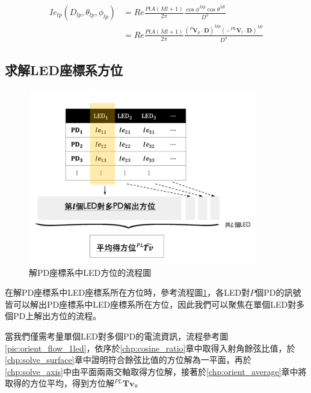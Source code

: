     \begin{equation}
        \label{eqn:model_algorithm_filter}
        \begin{aligned}
            Ie_{lp}(D_{lp},\theta_{lp},\phi_{lp}) &= Re\frac{PtA(Ml+1)}{2\pi}\frac{{\cos\phi}^{Mp}{\cos\theta}^{Ml}}{D^2}\\
            & = Re\frac{PtA(Ml+1)}{2\pi}\frac{{(^{P}\boldsymbol{V}_p\cdot\boldsymbol{D})}^{Mp}{(-^{PL}\boldsymbol{V}_l\cdot\boldsymbol{D})}^{Ml}}{D^4}
        \end{aligned}
    \end{equation}




    \subsection{求解LED座標系方位}
    \label{chp:solve_phi}

    \begin{figure}[htpb]
        \centering
        \includegraphics[width=10cm]{ch3pic/orient_flow.png}
        \caption{解PD座標系中LED方位的流程圖}
        \label{pic:orient_flow}
    \end{figure}

    

    在解PD座標系中LED座標系所在方位時，參考流程圖\ref{pic:orient_flow}，各LED對$P$個PD的訊號皆可以解出PD座標系中LED座標系所在方位，因此我們可以聚焦在單個LED對多個PD上解出方位的流程。
    
    當我們僅需考量單個LED對多個PD的電流資訊，流程參考圖\ref{pic:orient_flow_1led}，依序於\ref{chp:cosine_ratio}章中取得入射角餘弦比值，於\ref{chp:solve_surface}章中證明符合餘弦比值的方位解為一平面，再於\ref{chp:solve_axis}中由平面兩兩交軸取得方位解，接著於\ref{chp:orient_average}章中將取得的方位平均，得到方位解$^{PL}\boldsymbol{Tv}$。

